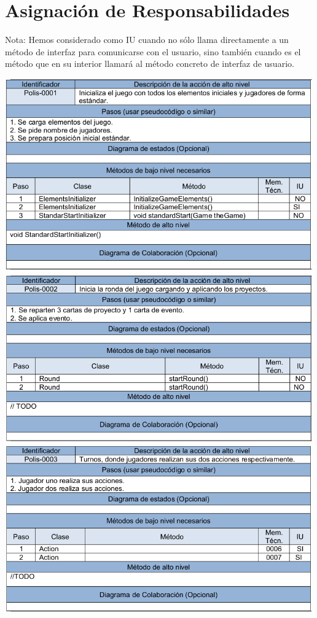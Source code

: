 \documentclass[11 pt]{book}
\begin{document}
\chapter{Asignación de Responsabilidades}
    Nota: Hemos considerado como IU cuando no sólo llama directamente a un método de interfaz para comunicarse con el usuario, sino también cuando es el método que en su interior llamará al método concreto de interfaz de usuario.

    \begin{center}
        \includegraphics[width=500px]{responsabilities-allocation/polis-0001.png}
        \includegraphics[width=500px]{responsabilities-allocation/polis-0002.png}
        \includegraphics[width=500px]{responsabilities-allocation/polis-0003.png}

\end{center}
\end{document}
